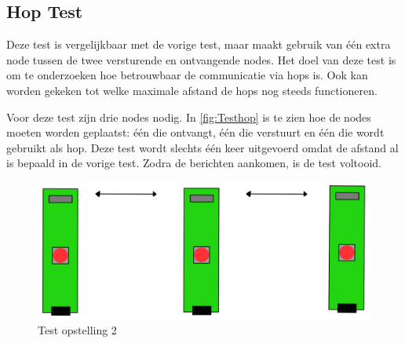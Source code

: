 \vspace{0.5cm}

\begin{figure}[ht]
    \centering
\end{figure}

\newpage
\subsection{Hop Test}
Deze test is vergelijkbaar met de vorige test, maar maakt gebruik van één extra node tussen de twee versturende en ontvangende nodes. Het doel van deze test is om te onderzoeken hoe betrouwbaar de communicatie via hops is. Ook kan worden gekeken tot welke maximale afstand de hops nog steeds functioneren.

Voor deze test zijn drie nodes nodig. In \autoref{fig:Testhop} is te zien hoe de nodes moeten worden geplaatst: één die ontvangt, één die verstuurt en één die wordt gebruikt als hop. Deze test wordt slechts één keer uitgevoerd omdat de afstand al is bepaald in de vorige test. Zodra de berichten aankomen, is de test voltooid.
\begin{figure}[h]
    \centering
    \includegraphics[scale = 0.4]{img/test2.png}
    \caption{Test opstelling 2}
    \label{fig:Testhop}
\end{figure}

